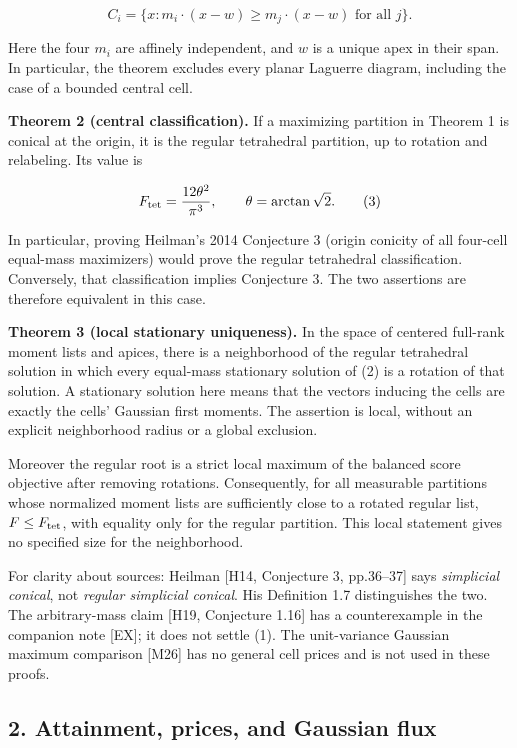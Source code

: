 \documentclass[
  11pt,
]{article}
\begin{document}
\[
 C_i=\{x:m_i\cdot(x-w)\ge m_j\cdot(x-w)\text{ for all }j\}.\tag{2}
\]

Here the four \(m_i\) are affinely independent, and \(w\) is a unique
apex in their span. In particular, the theorem excludes every planar
Laguerre diagram, including the case of a bounded central cell.

\textbf{Theorem 2 (central classification).} If a maximizing partition
in Theorem 1 is conical at the origin, it is the regular tetrahedral
partition, up to rotation and relabeling. Its value is

\[
 F_{\rm tet}=\frac{12\theta^2}{\pi^3},\qquad
 \theta=\arctan\sqrt2.                                  \tag{3}
\]

In particular, proving Heilman's 2014 Conjecture 3 (origin conicity of
all four-cell equal-mass maximizers) would prove the regular tetrahedral
classification. Conversely, that classification implies Conjecture 3.
The two assertions are therefore equivalent in this case.

\textbf{Theorem 3 (local stationary uniqueness).} In the space of
centered full-rank moment lists and apices, there is a neighborhood of
the regular tetrahedral solution in which every equal-mass stationary
solution of (2) is a rotation of that solution. A stationary solution
here means that the vectors inducing the cells are exactly the cells'
Gaussian first moments. The assertion is local, without an explicit
neighborhood radius or a global exclusion.

Moreover the regular root is a strict local maximum of the balanced
score objective after removing rotations. Consequently, for all
measurable partitions whose normalized moment lists are sufficiently
close to a rotated regular list, \(F\le F_{\rm tet}\), with equality
only for the regular partition. This local statement gives no specified
size for the neighborhood.

For clarity about sources: Heilman {[}H14, Conjecture 3, pp.36--37{]}
says \emph{simplicial conical}, not \emph{regular simplicial conical}.
His Definition 1.7 distinguishes the two. The arbitrary-mass claim
{[}H19, Conjecture 1.16{]} has a counterexample in the companion note
{[}EX{]}; it does not settle (1). The unit-variance Gaussian maximum
comparison {[}M26{]} has no general cell prices and is not used in these
proofs.

\subsection{2. Attainment, prices, and Gaussian
flux}\label{attainment-prices-and-gaussian-flux}
\end{document}
